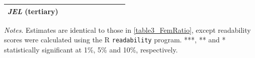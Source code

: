 \begin{table}
\begin{threeparttable}
\begin{tabular}{p{3cm}S@{}S@{}S@{}S@{}S@{}S@{}S@{}S@{}S@{}}
            \textit{JEL} (tertiary)       &               &               &               &               &               &               &               &               &           {}   \\
            \bottomrule
        \end{tabular}
        \begin{tablenotes}
            \tiny
            \item \textit{Notes}. Estimates are identical to those in \autoref{table3_FemRatio}, except readability scores were calculated using the R \texttt{readability} program. ***, ** and * statistically significant at 1\%, 5\% and 10\%, respectively.
        \end{tablenotes}
    \end{threeparttable}
\end{table}